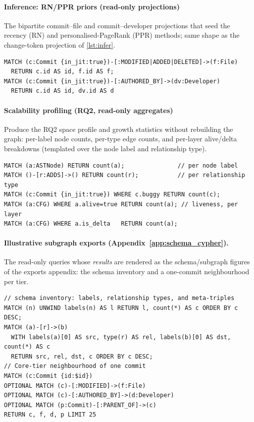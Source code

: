 \documentclass[final,5p,times,twocolumn]{elsarticle}
\theoremstyle{plain}
\begin{document}
\paragraph{Inference: RN/PPR priors (read-only projections)}
The bipartite commit--file and commit--developer projections that seed the recency (RN)
and personalised-PageRank (PPR) methods; same shape as the change-token projection of
\autoref{lst:infer}.
\begin{lstlisting}[style=cypher]
MATCH (c:Commit {in_jit:true})-[:MODIFIED|ADDED|DELETED]->(f:File)
  RETURN c.id AS id, f.id AS f;
MATCH (c:Commit {in_jit:true})-[:AUTHORED_BY]->(dv:Developer)
  RETURN c.id AS id, dv.id AS d
\end{lstlisting}

\paragraph{Scalability profiling (RQ2, read-only aggregates)}
Produce the RQ2 space profile and growth statistics without rebuilding the graph:
per-label node counts, per-type edge counts, and per-layer alive/delta breakdowns
(templated over the node label and relationship type).
\begin{lstlisting}[style=cypher]
MATCH (a:ASTNode) RETURN count(a);               // per node label
MATCH ()-[r:ADDS]->() RETURN count(r);           // per relationship type
MATCH (c:Commit {in_jit:true}) WHERE c.buggy RETURN count(c);
MATCH (a:CFG) WHERE a.alive=true RETURN count(a); // liveness, per layer
MATCH (a:CFG) WHERE a.is_delta   RETURN count(a);
\end{lstlisting}

\paragraph{Illustrative subgraph exports (Appendix~\ref{app:schema_cypher}).}
The read-only queries whose \emph{results} are rendered as the schema/subgraph figures
of the exports appendix: the schema inventory and a one-commit neighbourhood per tier.
\begin{lstlisting}[style=cypher]
// schema inventory: labels, relationship types, and meta-triples
MATCH (n) UNWIND labels(n) AS l RETURN l, count(*) AS c ORDER BY c DESC;
MATCH (a)-[r]->(b)
  WITH labels(a)[0] AS src, type(r) AS rel, labels(b)[0] AS dst, count(*) AS c
  RETURN src, rel, dst, c ORDER BY c DESC;
// Core-tier neighbourhood of one commit
MATCH (c:Commit {id:$id})
OPTIONAL MATCH (c)-[:MODIFIED]->(f:File)
OPTIONAL MATCH (c)-[:AUTHORED_BY]->(d:Developer)
OPTIONAL MATCH (p:Commit)-[:PARENT_OF]->(c)
RETURN c, f, d, p LIMIT 25
\end{lstlisting}
\end{document}
